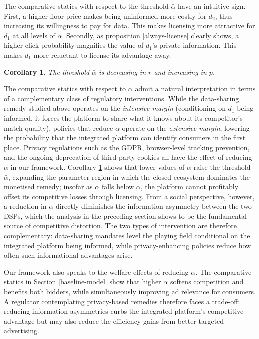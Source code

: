 \documentclass[11pt]{article}
\theoremstyle{plain}
\theoremstyle{definition}
\theoremstyle{plain}
\newtheorem{cor}[thm]{Corollary}
\theoremstyle{plain}
\theoremstyle{plain}
\theoremstyle{plain}
\numberwithin{equation}{section}
\begin{document}
\noindent The comparative statics with respect to the threshold $\bar{\alpha}$ have an intuitive sign. First, a higher floor price makes being uninformed more costly for $d_2$, thus increasing its willingness to pay for data. This makes licensing more attractive for $d_1$ at all levels of $\alpha$. Secondly, as proposition \ref{always-license} clearly shows, a higher click probability magnifies the value of $d_1$'s private information. This makes $d_1$ more reluctant to license its advantage away.
\begin{cor}\label{alpha-threshold}
    The threshold $\bar{\alpha}$ is decreasing in $r$ and increasing in $p$.
\end{cor}
\par
\vspace{2mm}
\noindent The comparative statics with respect to $\alpha$ admit a natural interpretation in terms of a complementary class of regulatory interventions. While the data-sharing remedy studied above operates on the \textit{intensive margin} (conditioning on $d_1$ being informed, it forces the platform to share what it knows about its competitor's match quality), policies that reduce $\alpha$ operate on the \textit{extensive margin}, lowering the probability that the integrated platform can identify consumers in the first place. Privacy regulations such as the GDPR, browser-level tracking prevention, and the ongoing deprecation of third-party cookies all have the effect of reducing $\alpha$ in our framework. Corollary \ref{alpha-threshold} shows that lower values of $\alpha$ raise the threshold $\bar{\alpha}$, expanding the parameter region in which the closed ecosystem dominates the monetised remedy; insofar as $\alpha$ falls below $\bar{\alpha}$, the platform cannot profitably offset its competitive losses through licensing. From a social perspective, however, a reduction in $\alpha$ directly diminishes the information asymmetry between the two DSPs, which the analysis in the preceding section shows to be the fundamental source of competitive distortion. The two types of intervention are therefore complementary: data-sharing mandates level the playing field conditional on the integrated platform being informed, while privacy-enhancing policies reduce how often such informational advantages arise.

\noindent Our framework also speaks to the welfare effects of reducing $\alpha$. The comparative statics in Section \ref{baseline-model} show that higher $\alpha$ softens competition and benefits both bidders, while simultaneously improving ad relevance for consumers. A regulator contemplating privacy-based remedies therefore faces a trade-off: reducing information asymmetries curbs the integrated platform's competitive advantage but may also reduce the efficiency gains from better-targeted advertising.
\vspace{2mm}
\end{document}
